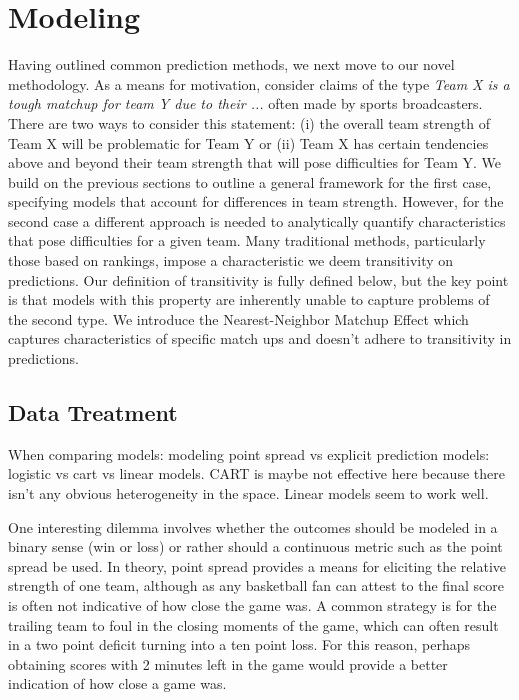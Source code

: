 \section{Modeling}
Having outlined common prediction methods, we next move to our novel methodology.  As a means for motivation, consider claims of the type \emph{Team X is a tough matchup for team Y due to their ...} often made by sports broadcasters.  There are two ways to consider this statement: (i) the overall team strength of Team X will be problematic for Team Y or (ii) Team X has certain tendencies above and beyond their team strength that will pose difficulties for Team Y.  We build on the previous sections to outline a general framework for the first case, specifying models that account for differences in team strength.  However, for the second case a different approach is needed to analytically quantify characteristics that pose difficulties for a given team.  Many traditional methods, particularly those based on rankings, impose a characteristic we deem transitivity on predictions.  Our definition of transitivity is fully defined below, but the key point is that models with this property are inherently unable to capture problems of the second type.  We introduce the Nearest-Neighbor Matchup Effect which captures characteristics of specific match ups and doesn't adhere to transitivity in predictions.  

\subsection{Data Treatment}
When comparing models: modeling point spread vs explicit prediction models: logistic vs cart vs linear models.
CART is maybe not effective here because there isn't any obvious heterogeneity in the space. Linear models seem to work well.

One interesting dilemma involves whether the outcomes should be modeled in a binary sense (win or loss) or rather should a continuous metric such as the point spread be used.  In theory, point spread provides a means for eliciting the relative strength of one team, although as any basketball fan can attest to the final score is often not indicative of how close the game was.  A common strategy is for the trailing team to foul in the closing moments of the game, which can often result in a two point deficit turning into a ten point loss.  For this reason, perhaps obtaining scores with 2 minutes left in the game would provide a better indication of how close a game was.


